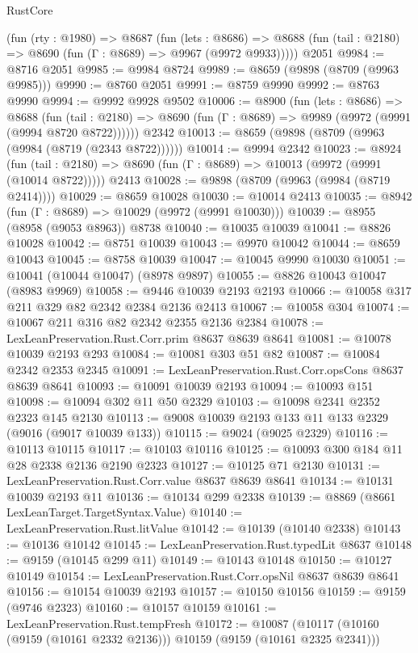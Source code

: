 \begin{lexlean}{RustCore}
\begin{coremodule}
    (fun (rty : @1980) =>
    @8687
      (fun (lets : @8686) =>
      @8688 (fun (tail : @2180) => @8690 (fun (Γ : @8689) => @9967 (@9972 @9933)))))
    @2051
@9984 := @8716 @2051
@9985 := @9984 @8724
@9989 := @8659 (@9898 (@8709 (@9963 @9985)))
@9990 := @8760 @2051
@9991 := @8759 @9990
@9992 := @8763 @9990
@9994 := @9992 @9928 @9502
@10006 := @8900
    (fun (lets : @8686) =>
    @8688
      (fun (tail : @2180) => @8690 (fun (Γ : @8689) => @9989 (@9972 (@9991 (@9994 @8720 @8722))))))
    @2342
@10013 := @8659 (@9898 (@8709 (@9963 (@9984 (@8719 (@2343 @8722))))))
@10014 := @9994 @2342
@10023 := @8924
    (fun (tail : @2180) => @8690 (fun (Γ : @8689) => @10013 (@9972 (@9991 (@10014 @8722)))))
    @2413
@10028 := @9898 (@8709 (@9963 (@9984 (@8719 @2414))))
@10029 := @8659 @10028
@10030 := @10014 @2413
@10035 := @8942 (fun (Γ : @8689) => @10029 (@9972 (@9991 @10030)))
@10039 := @8955 (@8958 (@9053 @8963)) @8738
@10040 := @10035 @10039
@10041 := @8826 @10028
@10042 := @8751 @10039
@10043 := @9970 @10042
@10044 := @8659 @10043
@10045 := @8758 @10039
@10047 := @10045 @9990 @10030
@10051 := @10041 (@10044 @10047) (@8978 @9897)
@10055 := @8826 @10043 @10047 (@8983 @9969)
@10058 := @9446 @10039 @2193 @2193
@10066 := @10058 @317 @211 @329 @82 @2342 @2384 @2136 @2413
@10067 := @10058 @304
@10074 := @10067 @211 @316 @82 @2342 @2355 @2136 @2384
@10078 := LexLeanPreservation.Rust.Corr.prim @8637 @8639 @8641
@10081 := @10078 @10039 @2193 @293
@10084 := @10081 @303 @51 @82
@10087 := @10084 @2342 @2353 @2345
@10091 := LexLeanPreservation.Rust.Corr.opsCons @8637 @8639 @8641
@10093 := @10091 @10039 @2193
@10094 := @10093 @151
@10098 := @10094 @302 @11 @50 @2329
@10103 := @10098 @2341 @2352 @2323 @145 @2130
@10113 := @9008 @10039 @2193 @133 @11 @133 @2329 (@9016 (@9017 @10039 @133))
@10115 := @9024 (@9025 @2329)
@10116 := @10113 @10115
@10117 := @10103 @10116
@10125 := @10093 @300 @184 @11 @28 @2338 @2136 @2190 @2323
@10127 := @10125 @71 @2130
@10131 := LexLeanPreservation.Rust.Corr.value @8637 @8639 @8641
@10134 := @10131 @10039 @2193 @11
@10136 := @10134 @299 @2338
@10139 := @8869 (@8661 LexLeanTarget.TargetSyntax.Value)
@10140 := LexLeanPreservation.Rust.litValue
@10142 := @10139 (@10140 @2338)
@10143 := @10136 @10142
@10145 := LexLeanPreservation.Rust.typedLit @8637
@10148 := @9159 (@10145 @299 @11)
@10149 := @10143 @10148
@10150 := @10127 @10149
@10154 := LexLeanPreservation.Rust.Corr.opsNil @8637 @8639 @8641
@10156 := @10154 @10039 @2193
@10157 := @10150 @10156
@10159 := @9159 (@9746 @2323)
@10160 := @10157 @10159
@10161 := LexLeanPreservation.Rust.tempFresh
@10172 := @10087 (@10117 (@10160 (@9159 (@10161 @2332 @2136))) @10159 (@9159 (@10161 @2325 @2341)))

\end{coremodule}
\end{lexlean}
